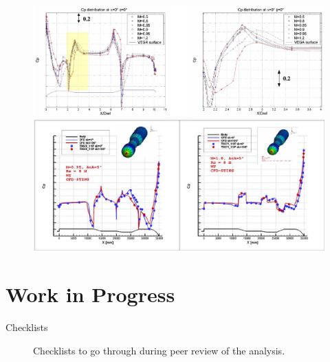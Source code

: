\documentclass[12pt]{article}
\begin{document}
\begin{figure}[H]
    \centering
    \includegraphics[width=0.95\linewidth]{figs/fig12-vega.png}
    \includegraphics[width=0.95\linewidth]{figs/fig13-vega.png}
    \label{fig:vega-adb}
\end{figure}

\newpage %
%

\section*{Work in Progress}

\begin{description}
    \item[Checklists] Checklists to go through during peer review of the analysis.
\end{description}
\end{document}
